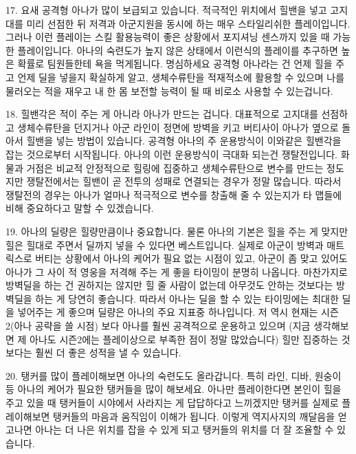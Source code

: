  



17. 요새 공격형 아나가 많이 보급되고 있습니다. 적극적인 위치에서 힐밴을 넣고 고지대를 미리 선점한 뒤 저격과 아군지원을 동시에 하는 매우 스타일리쉬한 플레이입니다. 그러나 이런 플레이는 스킬 활용능력이 좋은 상황에서 포지셔닝 센스까지 있을 때 가능한 플레이입니다. 아나의 숙련도가 높지 않은 상태에서 이런식의 플레이를 추구하면 높은 확률로 팀원들한테 욕을 먹게됩니다. 명심하세요 공격형 아나라는 건 언제 힐을 주고 언제 딜을 넣을지 확실하게 알고, 생체수류탄을 적재적소에 활용할 수 있으며 나를 물러오는 적을 재우고 내 한 몸 보전할 능력이 될 때 비로소 사용할 수 있는겁니다.

 



18. 힐밴각은 적이 주는 게 아니라 아나가 만드는 겁니다. 대표적으로 고지대를 선점하고 생체수류탄을 던지거나 아군 라인이 정면에 방벽을 키고 버티사이 아나가 옆으로 돌아서 힐밴을 넣는 방법이 있습니다. 공격형 아나의 주 운용방식이 이와같은 힐밴각을 잡는 것으로부터 시작됩니다. 아나의 이런 운용방식이 극대화 되는건 쟁탈전입니다. 화물과 거점은 비교적 안정적으로 힐링에 집중하고 생체수류탄으로 변수를 만드는 정도지만 쟁탈전에서는 힐밴이 곧 전투의 성패로 연결되는 경우가 정말 많습니다. 따라서 쟁탈전의 경우는 아나가 얼마나 적극적으로 변수를 창출해 줄 수 있는지가 타 맵들에 비해 중요하다고 말할 수 있겠습니다.

 



19. 아나의 딜량은 힐량만큼이나 중요합니다. 물론 아나의 기본은 힐을 주는 게 맞지만 힐은 힐대로 주면서 딜까지 넣을 수 있다면 베스트입니다. 실제로 아군이 방벽과 매트릭스로 버티는 상황에서 아나의 케어가 필요 없는 시점이 있고, 아군이 좀 맞고 있어도 아나가 그 사이 적 영웅을 저격해 주는 게 좋을 타이밍이 분명히 나옵니다. 마찬가지로 방벽딜을 하는 건 권하지는 않지만 힐 줄 사람이 없는데 아무것도 안하는 것보다는 방벽딜을 하는 게 당연히 좋습니다. 따라서 아나는 딜을 할 수 있는 타이밍에는 최대한 딜을 넣어주는 게 좋으며 딜량은 아나의 주요 지표중 하나입니다. 저 역시 현재는 시즌2(아나 공략을 쓸 시점) 보다 아나를 훨씬 공격적으로 운용하고 있으며 (지금 생각해보면 제 아나도 시즌2에는 플레이상으로 부족한 점이 정말 많았습니다) 힐만 집중하는 것보다는 훨씬 더 좋은 성적을 낼 수 있습니다.

 



20. 탱커를 많이 플레이해보면 아나의 숙련도도 올라갑니다. 특히 라인, 디바, 원숭이 등 아나의 케어가 필요한 탱커들을 많이 해보세요. 아나만 플레이한다면 본인이 힐을 주고 있을 때 탱커들이 시야에서 사라지는 게 답답하다고 느끼겠지만 탱커를 실제로 플레이해보면 탱커들의 마음과 움직임이 이해가 됩니다. 이렇게 역지사지의 깨달음을 얻고나면 아나는 더 나은 위치를 잡을 수 있게 되고 탱커들의 위치를 더 잘 조율할 수 있습니다.

